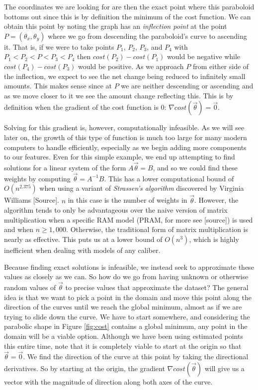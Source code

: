 The coordinates we are looking for are then the exact point where this
paraboloid bottoms out since this is by definition the minimum of the cost function. We can obtain
this point by noting the graph has an \emph{inflection point} at the point $P =
(\theta_x, \theta_y)$ where we go from descending the paraboloid's curve to
ascending it. That is, if we were to take points $P_1$, $P_2$, $P_3$, and $P_4$
with $P_1 < P_2 < P < P_3 < P_4$ then $cost(P_2) - cost(P_1)$ would be negative
while $cost(P_4) - cost(P_3)$ would be positive. As we approach $P$ from either
side of the inflection, we expect to see the net change being
reduced to infinitely small amounts. This makes sense since at
$P$ we are neither descending or ascending and as we move closer to it we see
the amount change reflecting this. This is by definition when the gradient of
the cost function is 0: $\nabla cost(\vec\theta) = \vec{0}$.

Solving for this gradient is, however, computationally infeasible. As we will
see later on, the growth of this type of function is much too large for many
modern computers to handle efficiently, especially as we begin adding more
components to our features. Even for this simple example, we end up attempting
to find solutions for a linear system of the form $A\vec\theta = B$, and so we could find these weights
by computing $\vec\theta =A^{-1}B$. This has a lower computational bound of
$O(n^{2.375})$ when using a variant of \emph{Strassen's algorithm} discovered by
Virginia Williams [Source]. $n$ in this case is the number of weights in
$\vec\theta$. However, the algorithm tends to only be advantageous over the naive
version of matrix multiplication when a specific RAM model (PRAM, for more see
[source]) is used and when $n \geq 1,000$. Otherwise, the traditional form of
matrix multiplication is nearly as effective. This puts us at a lower bound of
$O(n^3)$, which is highly inefficient when dealing with models of any caliber.

Because finding exact solutions is infeasible, we instead seek to approximate
these values as closely as we can. So how do we go from having unknown or otherwise random values of
$\vec\theta$ to precise values that approximate the dataset? The general idea is
that we want to pick a point in the domain and move this point along the direction of the curves until we reach the global minimum, almost as if we are trying to slide down the curve. We have to start
somewhere, and considering the parabolic shape in Figure \ref{fig:cost} contains a
global minimum, any point in the domain will be a viable option. Although we have been using estimated points this entire time, note that it is completely viable to start at the origin so that $\vec\theta = \vec0$. We find the direction of the curve at this point by taking the directional derivatives. So by starting at the origin, the gradient $\nabla cost(\vec\theta)$ will give us a vector with the magnitude of direction along both axes of the curve.

